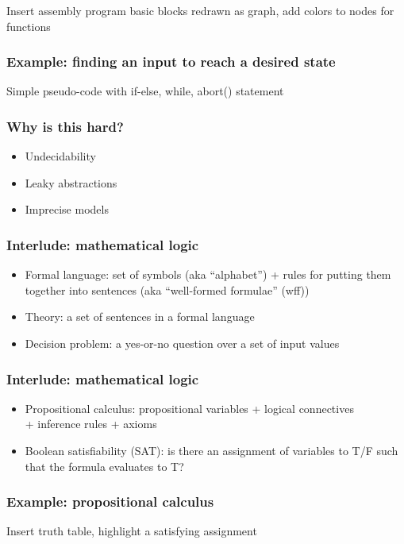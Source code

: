 \documentclass[11pt]{beamer}
\begin{document}
  \begin{frame}
    Insert assembly program basic blocks redrawn as graph, add colors to nodes for functions
  \end{frame}

  
\begin{frame}
\frametitle{Example: finding an input to reach a desired state}
  Simple pseudo-code with if-else, while, abort() statement
  \end{frame}

\begin{frame}
\frametitle{Why is this hard?}
\begin{itemize}
\item{Undecidability}
  \medskip
  \item{Leaky abstractions}
    \medskip
  \item{Imprecise models}
    \end{itemize}
  \end{frame}
  
  
\begin{frame}
  \frametitle{Interlude: mathematical logic}
  \begin{itemize}
  \item{Formal language: set of symbols (aka ``alphabet'') + rules for putting them together into sentences (aka ``well-formed formulae'' (wff))}
    \medskip
  \item{Theory: a set of sentences in a formal language}
    \medskip
  \item{Decision problem: a yes-or-no question over a set of input values}
\end{itemize}
\end{frame}

\begin{frame}
  \frametitle{Interlude: mathematical logic}
  \begin{itemize}
  \item{Propositional calculus: propositional variables + logical connectives \\
    + inference rules + axioms}
    \medskip
  \item{Boolean satisfiability (SAT): is there an assignment of variables to T/F such that the formula evaluates to T?}
  \end{itemize}
\end{frame}

\begin{frame}
  \frametitle{Example: propositional calculus}
  Insert truth table, highlight a satisfying assignment
\end{frame}
\end{document}
